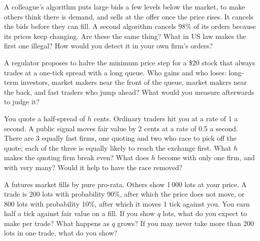 \begin{question}\label{iq:iv2:markets-and-microstructure:40}
A colleague's algorithm puts large bids a few levels below the market, to make others think there is demand, and sells at the offer once the price rises. It cancels the bids before they can fill. A second algorithm cancels 98\% of its orders because its prices keep changing. Are these the same thing? What in US law makes the first one illegal? How would you detect it in your own firm's orders?
\end{question}

\begin{question}\label{iq:iv2:markets-and-microstructure:41}
A regulator proposes to halve the minimum price step for a \$20 stock that always trades at a one-tick spread with a long queue. Who gains and who loses: long-term investors, market makers near the front of the queue, market makers near the back, and fast traders who jump ahead? What would you measure afterwards to judge it?
\end{question}

\begin{question}\label{iq:iv2:markets-and-microstructure:42}
You quote a half-spread of $h$ cents. Ordinary traders hit you at a rate of 1 a second. A public signal moves fair value by 2 cents at a rate of 0.5 a second. There are 3 equally fast firms, one quoting and two who race to pick off the quote; each of the three is equally likely to reach the exchange first. What $h$ makes the quoting firm break even? What does $h$ become with only one firm, and with very many? Would it help to have the race removed?
\end{question}

\begin{question}\label{iq:iv2:markets-and-microstructure:43}
A futures market fills by pure pro-rata. Others show 1\,000 lots at your price. A trade is 200 lots with probability 90\%, after which the price does not move, or 800 lots with probability 10\%, after which it moves 1 tick against you. You earn half a tick against fair value on a fill. If you show $q$ lots, what do you expect to make per trade? What happens as $q$ grows? If you may never take more than 200 lots in one trade, what do you show?
\end{question}


